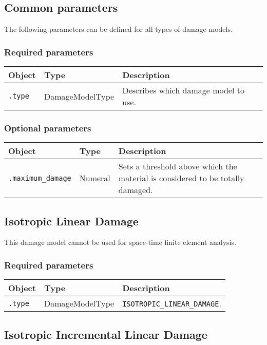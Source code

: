 \documentclass[10pt]{article}
\begin{document}
\subsection{Common parameters}

The following parameters can be defined for all types of damage models.

\subsubsection*{Required parameters}

\begin{tabularx}{\textwidth}{llX}
\hline 
Object & Type & Description \\ 
\hline 
\verb+.type+ & DamageModelType & Describes which damage model to use. \\ 
\hline 
\end{tabularx}

\subsubsection*{Optional parameters}

\begin{tabularx}{\textwidth}{llX}
\hline 
Object & Type & Description \\ 
\hline 
\verb+.maximum_damage+ & Numeral & Sets a threshold above which the material is considered to be totally damaged. \\ 
\hline 
\end{tabularx}

\subsection{Isotropic Linear Damage}

This damage model cannot be used for space-time finite element analysis.

\subsubsection*{Required parameters}

\begin{tabularx}{\textwidth}{llX}
\hline 
Object & Type & Description \\ 
\hline 
\verb+.type+ & DamageModelType & \verb+ISOTROPIC_LINEAR_DAMAGE+. \\ 
\hline 
\end{tabularx}

\subsection{Isotropic Incremental Linear Damage}
\end{document}
